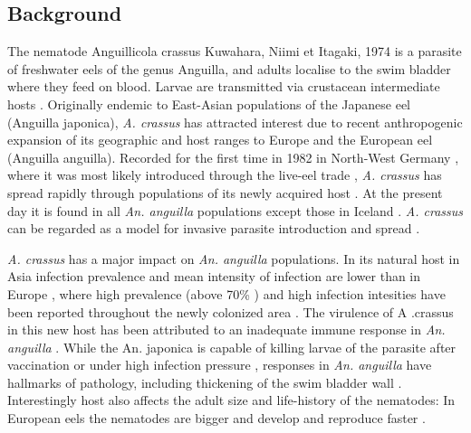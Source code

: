 \documentclass[10pt]{bmc_article}
\newenvironment{bmcformat}{\begin{raggedright}\baselineskip20pt\sloppy\setboolean{publ}{false}}{\end{raggedright}\baselineskip20pt\sloppy}
\begin{document}
\begin{bmcformat}
\section*{Background}
 

The nematode Anguillicola crassus Kuwahara, Niimi et Itagaki, 1974
\cite{kuwahara_Niimi_Itagaki_1974} is a parasite of freshwater eels of
the genus Anguilla, and adults localise to the swim bladder where they
feed on blood. Larvae are transmitted via crustacean intermediate
hosts \cite{de_charleroy_life_1990}. Originally endemic to East-Asian
populations of the Japanese eel (Anguilla japonica),
\textit{A. crassus} has attracted interest due to recent anthropogenic
expansion of its geographic and host ranges to Europe and the European
eel (Anguilla anguilla). Recorded for the first time in 1982 in
North-West Germany \cite{fischer_teichwirt}, where it was most likely
introduced through the live-eel trade
\cite{koops_anguillicola-infestations_1989, koie_swimbladder_1991},
\textit{A. crassus} has spread rapidly through populations of its
newly acquired host \cite{kirk_impact_2003}. At the present day it is
found in all \textit{An. anguilla} populations except those in Iceland
\cite{kristmundsson_parasite_2007}. \textit{A. crassus} can be
regarded as a model for invasive parasite introduction and spread
\cite{taraschewski_hosts_2007}.

\textit{A. crassus} has a major impact on \textit{An. anguilla} populations. In its
natural host in Asia infection prevalence and mean intensity of
infection are lower than in Europe \cite{mnderle_occurrence_2006},
where high prevalence (above 70\% \cite{wrtz_distribution_1998}) and
high infection intesities have been reported throughout the newly
colonized area \cite{lefebvre_anguillicolosis:_2004}. The virulence of
A .crassus in this new host has been attributed to an inadequate
immune response in \textit{An. anguilla} \cite{knopf_swimbladder_2006}. While
the An.  japonica is capable of killing larvae of the parasite after
vaccination \cite{knopf_vaccination_2008} or under high infection
pressure \cite{heitlinger_massive_2009}, responses in \textit{An. anguilla}
have hallmarks of pathology, including thickening of the swim bladder
wall \cite{wrtz_histopathological_2000}.  Interestingly host also
affects the adult size and life-history of the nematodes: In European
eels the nematodes are bigger and develop and reproduce faster
\cite{knopf_differences_2004}.


\end{bmcformat}
\end{document}
